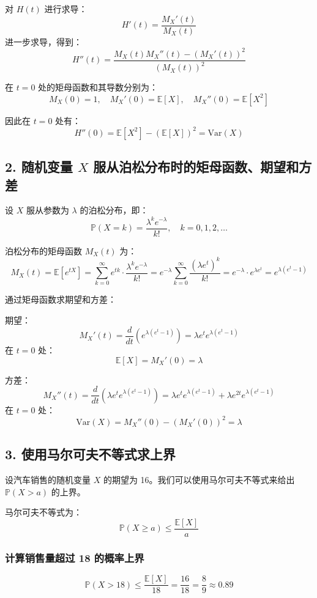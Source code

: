 \documentclass[UTF8]{report}
\theoremstyle{MyLineTheoremStyle} %
\theoremstyle{MyBlockTheoremStyle} %
\theoremstyle{MySubsubsectionStyle} %
\begin{document}
对 \( H(t) \) 进行求导：
\[
H'(t) = \frac{M_X'(t)}{M_X(t)}
\]
进一步求导，得到：
\[
H''(t) = \frac{M_X(t) M_X''(t) - (M_X'(t))^2}{(M_X(t))^2}
\]

在 \( t = 0 \) 处的矩母函数和其导数分别为：
\[
M_X(0) = 1, \quad M_X'(0) = \mathbb{E}[X], \quad M_X''(0) = \mathbb{E}[X^2]
\]

因此在 \( t = 0 \) 处有：
\[
H''(0) = \mathbb{E}[X^2] - (\mathbb{E}[X])^2 = \text{Var}(X)
\]

\subsection*{2. 随机变量 \( X \) 服从泊松分布时的矩母函数、期望和方差}

设 \( X \) 服从参数为 \( \lambda \) 的泊松分布，即：
\[
\mathbb{P}(X = k) = \frac{\lambda^k e^{-\lambda}}{k!}, \quad k = 0, 1, 2, \dots
\]

泊松分布的矩母函数 \( M_X(t) \) 为：
\[
M_X(t) = \mathbb{E}[e^{tX}] = \sum_{k=0}^{\infty} e^{tk} \cdot \frac{\lambda^k e^{-\lambda}}{k!}
= e^{-\lambda} \sum_{k=0}^{\infty} \frac{(\lambda e^t)^k}{k!}
= e^{-\lambda} \cdot e^{\lambda e^t}
= e^{\lambda (e^t - 1)}
\]

通过矩母函数求期望和方差：

期望：
\[
M_X'(t) = \frac{d}{dt} \left( e^{\lambda (e^t - 1)} \right) = \lambda e^t e^{\lambda (e^t - 1)}
\]
在 \( t = 0 \) 处：
\[
\mathbb{E}[X] = M_X'(0) = \lambda
\]

方差：
\[
M_X''(t) = \frac{d}{dt} \left( \lambda e^t e^{\lambda (e^t - 1)} \right) = \lambda e^t e^{\lambda (e^t - 1)} + \lambda e^{2t} e^{\lambda (e^t - 1)}
\]
在 \( t = 0 \) 处：
\[
\text{Var}(X) = M_X''(0) - (M_X'(0))^2 = \lambda
\]

\subsection*{3. 使用马尔可夫不等式求上界}

设汽车销售的随机变量 \( X \) 的期望为 16。我们可以使用马尔可夫不等式来给出 \( \mathbb{P}(X > a) \) 的上界。

马尔可夫不等式为：
\[
\mathbb{P}(X \geq a) \leq \frac{\mathbb{E}[X]}{a}
\]

\subsubsection*{计算销售量超过 18 的概率上界}

\[
\mathbb{P}(X > 18) \leq \frac{\mathbb{E}[X]}{18} = \frac{16}{18} = \frac{8}{9} \approx 0.89
\]
\end{document}
